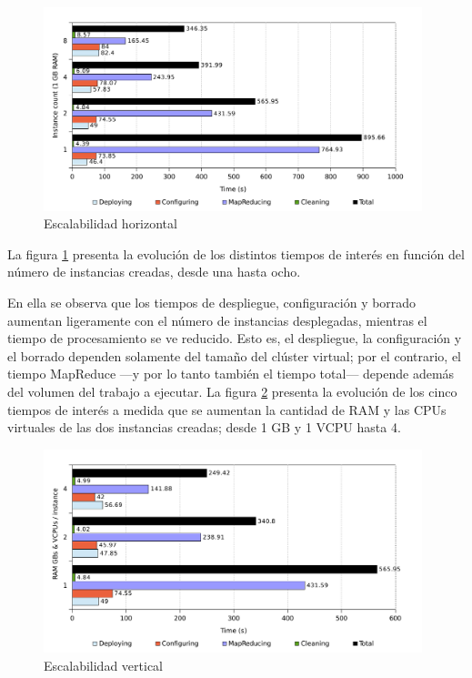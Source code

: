\begin{figure}[tbp]
\begin{center}
\includegraphics[width=0.98\textwidth]{imagenes/039.pdf}
\caption{Escalabilidad horizontal}
\label{fig:eschorizontal}
\end{center}
\end{figure}

\noindent La figura \ref{fig:eschorizontal} presenta la evoluci\'on de los distintos tiempos de inter\'es en funci\'on del n\'umero de instancias creadas, desde una hasta ocho. \newline

En ella se observa que los tiempos de despliegue, configuraci\'on y borrado aumentan ligeramente con el n\'umero de instancias desplegadas, mientras el tiempo de procesamiento se ve reducido. Esto es, el despliegue, la con\-fi\-gu\-ra\-ci\'on y el borrado dependen solamente del tama\~no del cl\'uster virtual; por el contrario, el tiempo MapReduce ---y por lo tanto tambi\'en el tiempo total--- depende adem\'as del volumen del trabajo a ejecutar. La figura \ref{fig:escvertical} presenta la evoluci\'on de los cinco tiempos de inter\'es a medida que se aumentan la cantidad de RAM y las CPUs virtuales de las dos instancias creadas; desde 1 GB y 1 VCPU hasta 4. \newline

\begin{figure}[tbp]
\begin{center}
\includegraphics[width=0.98\textwidth]{imagenes/041.pdf}
\caption{Escalabilidad vertical}
\label{fig:escvertical}
\end{center}
\end{figure}

